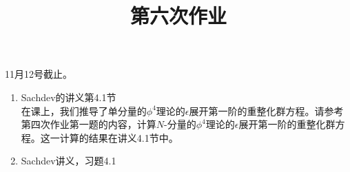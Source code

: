 \documentclass[12pt,aps,pra,notitlepage]{revtex4-1}
\begin{document}
\title{第六次作业}
\maketitle
\begin{center}
  11月12号截止。
\end{center}
\begin{enumerate}
  \item Sachdev的讲义第4.1节\\
  在课上，我们推导了单分量的$\phi^4$理论的$\epsilon$展开第一阶的重整化群方程。请参考第四次作业第一题的内容，计算$N$-分量的$\phi^4$理论的$\epsilon$展开第一阶的重整化群方程。这一计算的结果在讲义4.1节中。
  \item Sachdev讲义，习题4.1
\end{enumerate}
\end{document}
